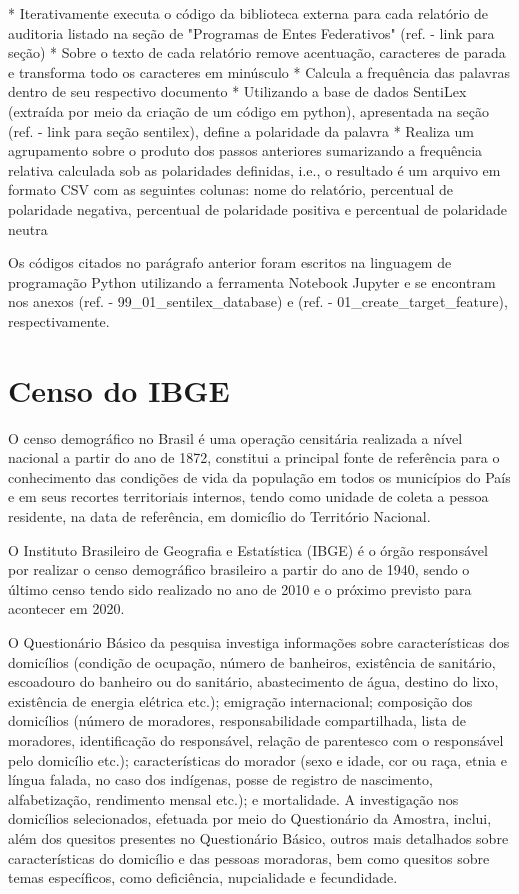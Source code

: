 * Iterativamente executa o código da biblioteca externa para cada relatório de auditoria listado na seção de "Programas de Entes Federativos" (ref. - link para seção)
* Sobre o texto de cada relatório remove acentuação, caracteres de parada e transforma todo os caracteres em minúsculo
* Calcula a frequência das palavras dentro de seu respectivo documento
* Utilizando a base de dados SentiLex (extraída por meio da criação de um código em python), apresentada na seção (ref. - link para seção sentilex), define a polaridade da palavra
* Realiza um agrupamento sobre o produto dos passos anteriores sumarizando a frequência relativa calculada sob as polaridades definidas, i.e., o resultado é um arquivo em formato CSV com as seguintes colunas: nome do relatório, percentual de polaridade negativa, percentual de polaridade positiva e percentual de polaridade neutra

Os códigos citados no parágrafo anterior foram escritos na linguagem de programação Python utilizando a ferramenta Notebook Jupyter e se encontram nos anexos (ref. - 99_01_sentilex_database) e (ref. - 01_create_target_feature), respectivamente.

\section{Censo do IBGE}
\label{sec:censo_do_ibge}

O censo demográfico no Brasil é uma operação censitária realizada a nível nacional a partir do ano de 1872, constitui a principal fonte de referência para o conhecimento das condições de vida da população em todos os municípios do País e em seus recortes territoriais internos, tendo como unidade de coleta a pessoa residente, na data de referência, em domicílio do Território Nacional.

O Instituto Brasileiro de Geografia e Estatística (IBGE) é o órgão responsável por realizar o censo demográfico brasileiro a partir do ano de 1940, sendo o último censo tendo sido realizado no ano de 2010 e o próximo previsto para acontecer em 2020.

O Questionário Básico da pesquisa investiga informações sobre características dos domicílios (condição de ocupação, número de banheiros, existência de sanitário, escoadouro do banheiro ou do sanitário, abastecimento de água, destino do lixo, existência de energia elétrica etc.); emigração internacional; composição dos domicílios (número de moradores, responsabilidade compartilhada, lista de moradores, identificação do responsável, relação de parentesco com o responsável pelo domicílio etc.); características do morador (sexo e idade, cor ou raça, etnia e língua falada, no caso dos indígenas, posse de registro de nascimento, alfabetização, rendimento mensal etc.); e mortalidade. A investigação nos domicílios selecionados, efetuada por meio do Questionário da Amostra, inclui, além dos quesitos presentes no Questionário Básico, outros mais detalhados sobre características do domicílio e das pessoas moradoras, bem como quesitos sobre temas específicos, como deficiência, nupcialidade e fecundidade.

